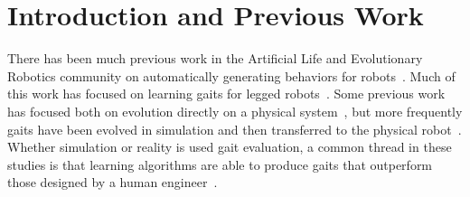 \section{Introduction and Previous Work}


There has been much previous work in the Artificial Life and
Evolutionary Robotics community on automatically generating behaviors
for robots~\citep{nolfi2000evolutionary,
  sims1994evolving, hornby2005autonomous, lipson2000automatic}. Much
of this work has focused on learning gaits for legged
robots~\citep{clune2009evolving, clune2011performance,
  hornby2005autonomous, hornby2003generative,
  Koos2012, bongard2006resilient,
  yosinski2011evolving-robot-gaits}.  Some previous work
has focused both on evolution directly on a physical
system~\citep{yosinski2011evolving-robot-gaits, zykov2004evolving}, but more
frequently gaits have been evolved in simulation and then transferred
to the physical robot~\citep{lipson2006evolutionary, Koos2012,
  hornby2005autonomous, bongard2006resilient}.  Whether simulation or
reality is used gait evaluation, a common thread in these
studies is that learning algorithms are able to produce gaits that
outperform those designed by a human
engineer~\citep{yosinski2011evolving-robot-gaits, hornby2005autonomous}.



%
%
%
